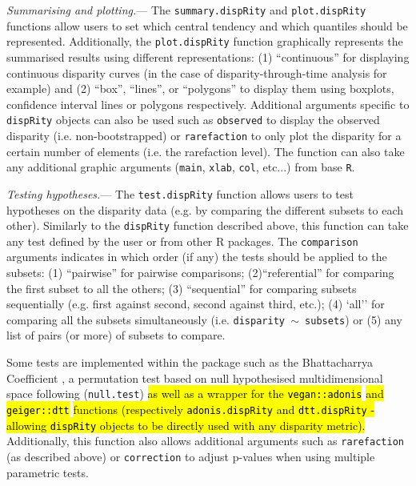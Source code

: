 \documentclass[12pt,letterpaper]{article}
\renewcommand{\subsubsection}[1]{%
\vspace{2ex}
\noindent
\textit{#1.}---}
\newcommand{\disp}{\texttt{dispRity} }
\begin{document}
\subsubsection{Summarising and plotting}
The \texttt{summary.dispRity} and \texttt{plot.dispRity} functions allow users to set which central tendency and which quantiles should be represented.
Additionally, the \texttt{plot.dispRity} function graphically represents the summarised results using different representations: (1) ``continuous'' for displaying continuous disparity curves (in the case of disparity-through-time analysis for example) and (2) ``box'', ``lines'', or ``polygons'' to display them using boxplots, confidence interval lines or polygons respectively.
Additional arguments specific to \disp objects can also be used such as \texttt{observed} to display the observed disparity (i.e. non-bootstrapped) or \texttt{rarefaction} to only plot the disparity for a certain number of elements (i.e. the rarefaction level).
The function can also take any additional graphic arguments (\texttt{main}, \texttt{xlab}, \texttt{col}, etc...) from base \texttt{R}.

\subsubsection{Testing hypotheses}
The \texttt{test.dispRity} function allows users to test hypotheses on the disparity data (e.g. by comparing the different subsets to each other).
Similarly to the \disp function described above, this function can take any test defined by the user or from other R packages.
The \texttt{comparison} arguments indicates in which order (if any) the tests should be applied to the subsets: (1) ``pairwise'' for pairwise comparisons; (2)``referential'' for comparing the first subset to all the others; (3) ``sequential'' for comparing subsets sequentially (e.g. first against second, second against third, etc.); (4) `all'' for comparing all the subsets simultaneously (i.e. \texttt{disparity $\mathtt{\sim}$ subsets}) or (5) any list of pairs (or more) of subsets to compare.

Some tests are implemented within the package such as the Bhattacharrya Coefficient \citep[\texttt{bhatt.coeff};][]{Bhattacharyya,GuillermeCooper}, a permutation test based on null hypothesised multidimensional space following \cite{diaz2016global} (\texttt{null.test}) 
\hl{as well as a wrapper for the \texttt{vegan::adonis}}
 \citep{oksanen2007vegan}
\hl{and \texttt{geiger::dtt}}
 \citep{geiger2008}
\hl{functions (respectively \texttt{adonis.dispRity} and \texttt{dtt.dispRity} - allowing \texttt{dispRity} objects to be directly used with any disparity metric).}
Additionally, this function also allows additional arguments such as \texttt{rarefaction} (as described above) or \texttt{correction} to adjust p-values when using multiple parametric tests.
\end{document}
